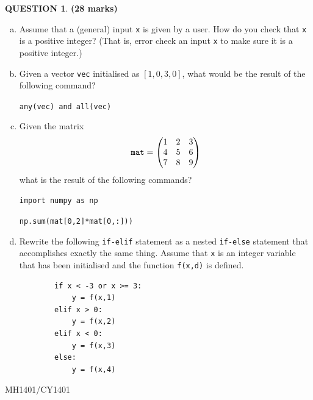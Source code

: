 \documentclass[a4paper,12pt]{article}
\theoremstyle{definition}
\newtheorem{ques}[dummy]{QUESTION}
\theoremstyle{plain}
\newcommand{\ttx}[1]{\texttt{#1}}
\begin{document}
\begin{ques}\hfill \textbf{(28 marks)}\\
	\begin{enumerate}[(a)]
		\item Assume that a (general) input \texttt{x} is given by a user. How do you check that \ttx{x} is a positive integer? (That is, error check an input \ttx{x} to make sure it is a positive integer.)
		
		\item Given a vector \ttx{vec} initialised as $[1, 0, 3, 0]$, what would be the result of the following command?\vspace*{1em}
		
		\ttx{any(vec) and all(vec)}
		
		\item Given the matrix\begin{equation*}
		\text{\ttx{mat}} = \begin{pmatrix*}
		1 & 2 & 3\\4 & 5 & 6\\7 & 8 & 9
		\end{pmatrix*}
		\end{equation*}
		what is the result of the following commands?\vspace*{1em}
		
		\texttt{import numpy as np}
		
		\texttt{np.sum(mat[0,2]*mat[0,:]))}
		
		\item Rewrite the following \texttt{if-elif} statement as a nested \texttt{if-else} statement that accomplishes exactly the same thing. Assume that \texttt{x} is an integer variable that has been initialised and the function \texttt{f(x,d)} is defined.
		\begin{verbatim}
		if x < -3 or x >= 3:
		    y = f(x,1)
		elif x > 0:
		    y = f(x,2)
		elif x < 0:
		    y = f(x,3)
		else:
		    y = f(x,4)
		\end{verbatim}
	\end{enumerate}
\end{ques}

\newpage

\hfill MH1401/CY1401\vspace*{0.5em}
\end{document}
